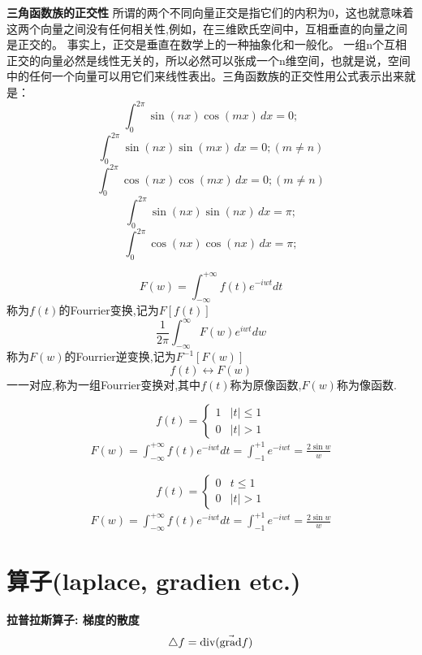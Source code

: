 \documentclass{book}
\begin{document}
\textbf{三角函数族的正交性}
所谓的两个不同向量正交是指它们的内积为0，这也就意味着这两个向量之间没有任何相关性,例如，在三维欧氏空间中，互相垂直的向量之间是正交的。
事实上，正交是垂直在数学上的一种抽象化和一般化。
一组n个互相正交的向量必然是线性无关的，所以必然可以张成一个n维空间，也就是说，空间中的任何一个向量可以用它们来线性表出。三角函数族的正交性用公式表示出来就是：
$$\int _{0}^{2\pi}\sin (nx)\cos (mx) \,dx=0;$$
$$\int _{0}^{2\pi}\sin (nx)\sin (mx) \,dx=0;(m\ne n)$$
$$\int _{0}^{2\pi}\cos (nx)\cos (mx) \,dx=0;(m\ne n)$$
$$\int _{0}^{2\pi}\sin (nx)\sin (nx) \,dx=\pi;$$
$$\int _{0}^{2\pi}\cos (nx)\cos (nx) \,dx=\pi;$$
\bigskip

$$F(w)=\int_{-\infty}^{+\infty}f(t)e^{-iwt}dt$$
称为$f(t)$的Fourrier变换,记为$F[f(t)]$
$$\frac{ 1}{2\pi}\int_{-\infty}^{\infty}F(w)e^{iwt}dw$$称为$F(w)$的Fourrier逆变换,记为$F^{-1}[F(w)]$
$$f(t) \longleftrightarrow F(w)$$一一对应,称为一组Fourrier变换对,其中$f(t)$称为原像函数,$F(w)$称为像函数.
\begin{example}
\begin{equation}
f(t)=
\left\{
		\begin{array}{ll}
			1 & |t| \leq 1 \\
			0 & |t| > 1
		\end{array}
		\right.
\end{equation}
\begin{eqnarray}
 F(w)=\int_{-\infty}^{+\infty} f(t)e^{-iwt}dt=\int_{-1}^{+1}e^{-iwt}=\frac{2\sin w}{w}
\end{eqnarray}
\end{example}

\begin{example}
\begin{equation}
f(t)=
\left\{
		\begin{array}{ll}
			0 & t \leq 1 \\
			0 & |t| > 1
		\end{array}
		\right.
\end{equation}
\begin{eqnarray}
 F(w)=\int_{-\infty}^{+\infty} f(t)e^{-iwt}dt=\int_{-1}^{+1}e^{-iwt}=\frac{2\sin w}{w}
\end{eqnarray}
\end{example}

\section{算子(laplace, gradien etc.)}
\textbf{拉普拉斯算子: 梯度的散度}
$$\mathop{}\!\mathbin\bigtriangleup f = \mbox{div} (\vec{\mbox{grad}}f)$$
\end{document}
